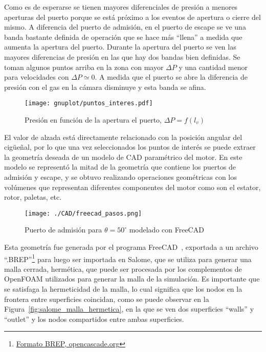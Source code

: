 Como es de esperarse se tienen mayores diferenciales de presión a menores
aperturas del puerto porque se está próximo a los eventos de apertura o cierre
del mismo.
%
A diferencia del puerto de admisión, en el puerto de escape se ve una banda
bastante definida de operación que se hace más ``llena'' a medida que aumenta la
apertura del puerto.
%
Durante la apertura del puerto se ven las mayores diferencias de presión en las
que hay dos bandas bien definidas.
%
Se toman algunos puntos arriba en la zona con mayor $\Delta P$ y una cantidad
menor para velocidades con $\Delta P \simeq 0$.
%
A medida que el puerto se abre la diferencia de presión con el gas en la cámara
disminuye y esta banda se afina.

\begin{figure}
    \centering
    \texttt{[image: gnuplot/puntos\_interes.pdf]}
    \caption{Presión en función de la apertura el puerto,
$\Delta P = f(l_{v})$}\label{fig:puntos_interes}
\end{figure}

El valor de alzada está directamente relacionado con la posición angular del
cigüeñal, por lo que una vez seleccionados los puntos de interés se puede
extraer la geometría deseada de un modelo de CAD paramétrico del motor.
%
En este modelo se representó la mitad de la geometría que contiene los puertos
de admisión y escape, y se obtuvo realizando operaciones geométricas con los
volúmenes que representan diferentes componentes del motor como son el estator,
rotor, paletas, etc.


\begin{figure}
    \centering
    \texttt{[image: ./CAD/freecad\_pasos.png]}
    \caption{Puerto de admisión para $\theta=50^{\circ}$ modelado con
FreeCAD}\label{fig:admision_50}
\end{figure}

Esta geometría fue generada por el programa FreeCAD~\parencite{freecad},
exportada a un archivo
``.BREP''\footnote{\href{https://dev.opencascade.org/doc/overview/html/specification\_\_brep\_format.html}{Formato
BREP, opencascade.org}} para luego ser importada en Salome\parencite{salome},
que se utiliza para generar una malla cerrada, hermética, que puede ser
procesada por los complementos de OpenFOAM utilizados para generar la malla de
la simulación.
%
Es importante que se satisfaga la hermeticidad de la malla, lo cual significa
que los nodos en la frontera entre superficies coincidan, como se puede observar
en la Figura~\ref{fig:salome_malla_hermetica}, en la que se ven dos superficies
``walls'' y ``outlet'' y los nodos compartidos entre ambas superficies.
%

